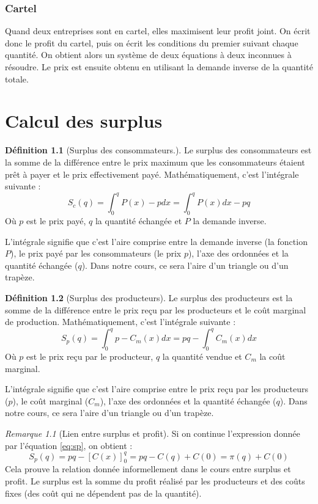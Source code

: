 \documentclass[
]{book}
\theoremstyle{definition}
\newtheorem{definition}{Définition}[chapter]
\theoremstyle{definition}
\theoremstyle{definition}
\theoremstyle{definition}
\theoremstyle{remark}
\newtheorem*{remark}{Remarque}
\begin{document}
\hypertarget{cartel}{%
\subsection{Cartel}\label{cartel}}

Quand deux entreprises sont en cartel, elles maximisent leur profit joint.
On écrit donc le profit du cartel, puis on écrit les conditions du premier suivant chaque quantité.
On obtient alors un système de deux équations à deux inconnues à résoudre.
Le prix est ensuite obtenu en utilisant la demande inverse de la quantité totale.

\hypertarget{calcul-des-surplus}{%
\chapter{Calcul des surplus}\label{calcul-des-surplus}}

\begin{definition}[Surplus des consommateurs.]
Le surplus des consommateurs est la somme de la différence entre le prix maximum que les consommateurs étaient prêt à payer et le prix effectivement payé.
Mathématiquement, c'est l'intégrale suivante :
\[
S_c(q)=\int_0^qP(x)-pdx=\int_0^qP(x)dx-pq
\]
Où \(p\) est le prix payé, \(q\) la quantité échangée et \(P\) la demande inverse.
\end{definition}

L'intégrale signifie que c'est l'aire comprise entre la demande inverse (la fonction \(P\)), le prix payé par les consommateurs (le prix \(p\)), l'axe des ordonnées et la quantité échangée (\(q\)).
Dans notre cours, ce sera l'aire d'un triangle ou d'un trapèze.

\begin{definition}[Surplus des producteurs]
Le surplus des producteurs est la somme de la différence entre le prix reçu par les producteurs et le coût marginal de production.
Mathématiquement, c'est l'intégrale suivante :
\[
S_p(q)=\int_0^qp-C_m(x)dx=pq-\int_0^qC_m(x)dx \label{eq:sp}
\]
Où \(p\) est le prix reçu par le producteur, \(q\) la quantité vendue et \(C_m\) la coût marginal.
\end{definition}

L'intégrale signifie que c'est l'aire comprise entre le prix reçu par les producteurs (\(p\)), le coût marginal (\(C_m\)), l'axe des ordonnées et la quantité échangée (\(q\)).
Dans notre cours, ce sera l'aire d'un triangle ou d'un trapèze.

\begin{remark}[Lien entre surplus et profit]
Si on continue l'expression donnée par l'équation \eqref{eq:sp}, on obtient :
\[S_p(q)=pq-\left[C(x)\right]_0^q=pq-C(q)+C(0)=\pi(q)+C(0)\]
Cela prouve la relation donnée informellement dans le cours entre surplus et profit.
Le surplus est la somme du profit réalisé par les producteurs et des coûts fixes (des coût qui ne dépendent pas de la quantité).
\end{remark}
\end{document}
